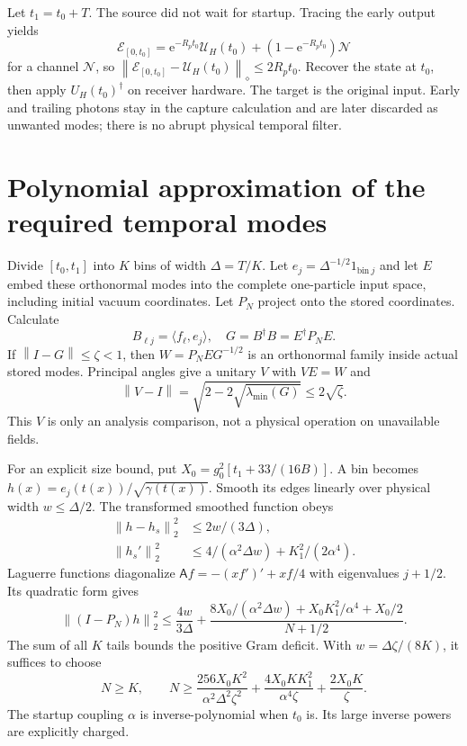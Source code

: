 \documentclass[11pt,a4paper]{article}
\newcommand{\norm}[1]{\left\lVert #1\right\rVert}\newcommand{\ket}[1]{\lvert #1\rangle}\newcommand{\bra}[1]{\langle #1\rvert}
\newcommand{\ee}{\mathrm e}
\begin{document}
Let $t_1=t_0+T$. The source did not wait for startup. Tracing the early output yields
\begin{equation}
 \mathcal E_{[0,t_0]}=\ee^{-R_pt_0}\mathcal U_H(t_0)
 +(1-\ee^{-R_pt_0})\mathcal N
\end{equation}
for a channel $\mathcal N$, so $\norm{\mathcal E_{[0,t_0]}-\mathcal U_H(t_0)}_\diamond\le2R_pt_0$. Recover the state at $t_0$, then apply $U_H(t_0)^\dagger$ on receiver hardware. The target is the original input. Early and trailing photons stay in the capture calculation and are later discarded as unwanted modes; there is no abrupt physical temporal filter.

\section{Polynomial approximation of the required temporal modes}

Divide $[t_0,t_1]$ into $K$ bins of width $\Delta=T/K$. Let $e_j=\Delta^{-1/2}1_{\mathrm{bin}\ j}$ and let $E$ embed these orthonormal modes into the complete one-particle input space, including initial vacuum coordinates. Let $P_N$ project onto the stored coordinates. Calculate
\begin{equation}
 B_{\ell j}=\langle f_\ell,e_j\rangle,\quad G=B^\dagger B=E^\dagger P_NE.
\end{equation}
If $\norm{I-G}\le\zeta<1$, then $W=P_NEG^{-1/2}$ is an orthonormal family inside actual stored modes. Principal angles give a unitary $V$ with $VE=W$ and
\begin{equation}
 \norm{V-I}=\sqrt{2-2\sqrt{\lambda_{\min}(G)}}\le2\sqrt\zeta.
\end{equation}
This $V$ is only an analysis comparison, not a physical operation on unavailable fields.

For an explicit size bound, put $X_0=g_0^2[t_1+33/(16B)]$. A bin becomes $h(x)=e_j(t(x))/\sqrt{\gamma(t(x))}$. Smooth its edges linearly over physical width $w\le\Delta/2$. The transformed smoothed function obeys
\begin{align}
 \norm{h-h_s}_2^2&\le2w/(3\Delta),\\
 \norm{h_s'}_2^2&\le4/(\alpha^2\Delta w)+K_1^2/(2\alpha^4).
\end{align}
Laguerre functions diagonalize $\mathsf A f=-(xf')'+xf/4$ with eigenvalues $j+1/2$. Its quadratic form gives
\begin{equation}
 \norm{(I-P_N)h}_2^2\le\frac{4w}{3\Delta}
 +\frac{8X_0/(\alpha^2\Delta w)+X_0K_1^2/\alpha^4+X_0/2}{N+1/2}.
\end{equation}
The sum of all $K$ tails bounds the positive Gram deficit. With $w=\Delta\zeta/(8K)$, it suffices to choose
\begin{equation}
 N\ge K,\qquad
 N\ge\frac{256X_0K^2}{\alpha^2\Delta^2\zeta^2}
       +\frac{4X_0KK_1^2}{\alpha^4\zeta}
       +\frac{2X_0K}{\zeta}.
 \label{eq:modecount}
\end{equation}
The startup coupling $\alpha$ is inverse-polynomial when $t_0$ is. Its large inverse powers are explicitly charged.
\end{document}
